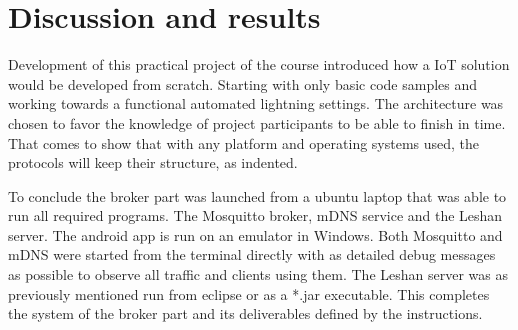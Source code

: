 \section{Discussion and results}

Development of this practical project of the course introduced how a IoT solution would be developed from scratch. Starting with only basic code samples and working towards a functional automated lightning settings. The architecture was chosen to favor the knowledge of project participants to be able to finish in time. That comes to show that with any platform and operating systems used, the protocols will keep their structure, as indented. 

To conclude the broker part was launched from a ubuntu laptop that was able to run all required programs. The Mosquitto broker, mDNS service and the Leshan server. The android app is run on an emulator in Windows. Both Mosquitto and mDNS were started from the terminal directly with as detailed debug messages as possible to observe all traffic and clients using them. The Leshan server was as previously mentioned run from eclipse or as a *.jar executable. This completes the system of the broker part and its deliverables defined by the instructions.